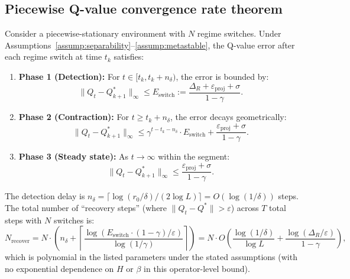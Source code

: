 \subsection{Piecewise Q-value convergence rate theorem}

\begin{theorem}
    \label{thm:piecewise_convergence_rate}
    Consider a piecewise-stationary environment with $N$ regime switches. Under Assumptions~\ref{assump:separability}--\ref{assump:metastable}, the Q-value error after each regime switch at time $t_k$ satisfies:
    \begin{enumerate}
        \item \textbf{Phase 1 (Detection):} For $t \in [t_k, t_k + n_\delta)$, the error is bounded by:
        \begin{equation}
            \|Q_t - Q^*_{k+1}\|_\infty \leq E_{\text{switch}} := \frac{\Delta_R + \varepsilon_{\text{proj}} + \sigma}{1 - \gamma}.
        \end{equation}
        \item \textbf{Phase 2 (Contraction):} For $t \geq t_k + n_\delta$, the error decays geometrically:
        \begin{equation}
            \|Q_t - Q^*_{k+1}\|_\infty \leq \gamma^{t - t_k - n_\delta} \cdot E_{\text{switch}} + \frac{\varepsilon_{\text{proj}} + \sigma}{1 - \gamma}.
        \end{equation}
        \item \textbf{Phase 3 (Steady state):} As $t \to \infty$ within the segment:
        \begin{equation}
            \|Q_t - Q^*_{k+1}\|_\infty \leq \frac{\varepsilon_{\text{proj}} + \sigma}{1 - \gamma}.
        \end{equation}
    \end{enumerate}
    The detection delay is $n_\delta = \lceil \log(r_0/\delta) / (2\log L) \rceil = O(\log(1/\delta))$ steps. The total number of ``recovery steps'' (where $\|Q_t - Q^*\| > \varepsilon$) across $T$ total steps with $N$ switches is:
    \begin{equation}
        N_{\text{recover}} = N \cdot \left( n_\delta + \left\lceil \frac{\log(E_{\text{switch}} \cdot (1-\gamma) / \varepsilon)}{\log(1/\gamma)} \right\rceil \right) = N \cdot O\left( \frac{\log(1/\delta)}{\log L} + \frac{\log(\Delta_R/\varepsilon)}{1-\gamma} \right),
    \end{equation}
    which is polynomial in the listed parameters under the stated assumptions (with no exponential dependence on $H$ or $\beta$ in this operator-level bound).
\end{theorem}
